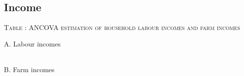\subsection{Income}


\hspace{-1cm}\begin{minipage}[t]{14cm}
\hfil\textsc{\normalsize Table \thetable: ANCOVA estimation of household labour incomes and farm incomes\label{tab ANCOVA LabourIncomes}}\\
\setlength{\tabcolsep}{.5pt}
\setlength{\baselineskip}{8pt}
\renewcommand{\arraystretch}{.55}

\vspace{2ex}
A. Labour incomes\\
\hfil{}\\
B. Farm incomes\\
\hfil{}\\


\end{minipage}

